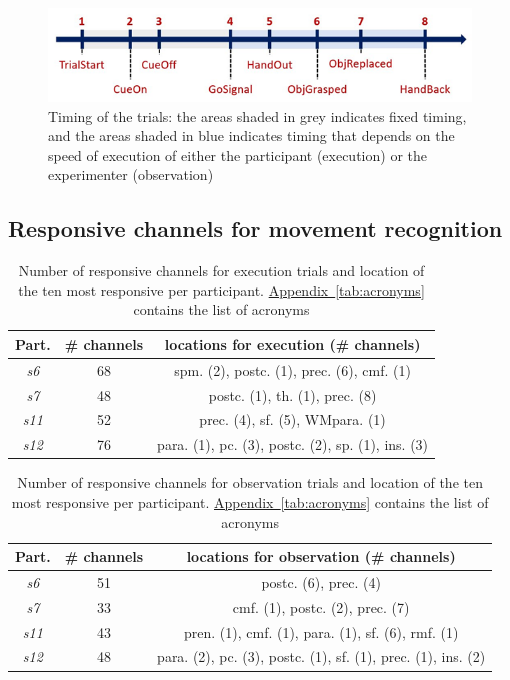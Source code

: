 \documentclass[10pt,conference,compsocconf]{IEEEtran}
\newcommand{\aref}[1]{\hyperref[#1]{Appendix~\ref*{#1}}}
\begin{document}
\begin{figure}[h!]
    \center
    \includegraphics[width=\linewidth]{images/2024-12-11-13-41-48.png}
    \caption{Timing of the trials: the areas shaded in grey indicates fixed timing, and the areas shaded in blue indicates timing that depends on the speed of execution of either the participant (execution) or the experimenter (observation)}
    \label{appfig:timeline}
  \end{figure}
  \FloatBarrier

\subsection{Responsive channels for movement recognition}
\begin{table}[h!]
    \centering
    \begin{tabular}{| c | c | c |}
        \hline
        Part. & \# channels & locations for execution (\# channels) \\
        \hline
        \textit{s6} & 68 & spm. (2), postc. (1), prec. (6), cmf. (1) \\
        \hline
        \textit{s7} & 48 & postc. (1), th. (1), prec. (8)\\
        \hline
        \textit{s11} & 52 & prec. (4), sf. (5), WMpara. (1)\\
        \hline
        \textit{s12} & 76 & para. (1), pc. (3), postc. (2), sp. (1), ins. (3)\\
        \hline
    \end{tabular}
    \caption{Number of responsive channels for execution trials and location of the ten most responsive per participant. \aref{tab:acronyms} contains the list of acronyms}
    \label{apptab:exmovchannellocations}
\end{table}

\begin{table}[h!]
    \centering
    \begin{tabular}{| c | c | c |}
        \hline
        Part. & \# channels & locations for observation (\# channels) \\
        \hline
        \textit{s6} & 51 & postc. (6), prec. (4)\\
        \hline
        \textit{s7} & 33 & cmf. (1), postc. (2), prec. (7) \\
        \hline
        \textit{s11} & 43 & pren. (1), cmf. (1), para. (1), sf. (6), rmf. (1)\\
        \hline
        \textit{s12} & 48 & para. (2), pc. (3), postc. (1), sf. (1), prec. (1), ins. (2)\\
        \hline
    \end{tabular}
    \caption{Number of responsive channels for observation trials and location of the ten most responsive per participant. \aref{tab:acronyms} contains the list of acronyms}
    \label{apptab:obsmovchannellocations}
\end{table}
\end{document}
